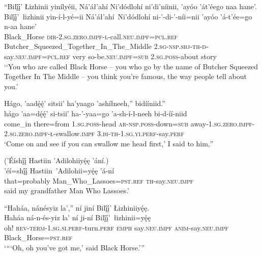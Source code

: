 \ea\label{ex:text2-20-1}
``Bilį́į́’ Łizhinii yinílyéii, Ná’áł’ahí Ni’dódlohí ni’di’níinii, ’ayóo ’át’éego naa hane’.\\
\gll Bilį́į́’~{łizhinii}	yin-í-l-yé=ii	Ná’áł’ahí~{Ni’dódlohí}	ni-’-di-’-níi=nii	’ayóo	’á-t’ée=go	n-aa	hane’\\
     Black\_Horse	\textsc{dir}-2.\textsc{sg}.\textsc{zero}.\textsc{impf}-\textsc{l}-call.\textsc{neu}.\textsc{impf}=\textsc{pcl}.\textsc{ref}	Butcher\_Squeezed\_Together\_In\_The\_Middle	2.\textsc{sg}-\textsc{nsp}.\textsc{sbj}-\textsc{th}-\textsc{d}-say.\textsc{neu}.\textsc{impf}=\textsc{pcl}.\textsc{ref}	very	so-be.\textsc{neu}.\textsc{impf}=\textsc{sub}	2.\textsc{sg}.\textsc{poss}-about	story\\
\glt `{`}You who are called Black Horse -- you who go by the name of Butcher Squeezed Together In The Middle -- you think you're famous, the way people tell about you.'
\z

\ea\label{ex:text2-20-2}
Hágo, ’aadę́ę́’ sitsii’ ha’yaago ’ashíłneeh,'' bidííniid.''\\
\gll hágo	’aa=dę́ę́’	si-tsii’	ha-’-yaa=go	’a-sh-í-ł-neeh	bi-d-íí-niid\\
     come\_in	there=from	1.\textsc{sg}.\textsc{poss}-head	\textsc{ar}-\textsc{nsp}.\textsc{poss}-down=\textsc{sub}	away-1.\textsc{sg}.\textsc{zero}.\textsc{impf}-2.\textsc{sg}.\textsc{zero}.\textsc{impf}-\textsc{ł}-swallow.\textsc{impf}	3.\textsc{bi}-\textsc{th}-1.\textsc{sg}.\textsc{yi}.\textsc{perf}-say.\textsc{perf}\\
\glt `Come on and see if you can swallow me head first,' I said to him,''
\z

\ea\label{ex:text2-20-3}
(’Éíshį́į́ Hastiin ’Adilohiiyę́ę ’ání.)\\
\gll ’éí=shį́į́	Hastiin~{’Adilohii=yę́ę}	’á-ní\\
     that=probably	Man\_Who\_Lassoes=\textsc{pst}.\textsc{ref}	\textsc{th}-say.\textsc{neu}.\textsc{impf}\\
\glt said my grandfather Man Who Lassoes.'
\z

\ea\label{ex:text2-21}
``Haháa, nánésyiz la’,'' ní jiní Bilį́į́’ Łizhiniiyę́ę.\\
\gll Haháa	ná-n-és-yiz	la’	ní	ji-ní	Bilį́į́’~{łizhinii=yę́ę}\\
     oh!	\textsc{rev}-\textsc{term}-1.\textsc{sg}.\textsc{si}.\textsc{perf}-turn.\textsc{perf}	\textsc{emph}	say.\textsc{neu}.\textsc{impf}	\textsc{anim}-say.\textsc{neu}.\textsc{impf}	Black\_Horse=\textsc{pst}.\textsc{ref}\\
\glt `{``}`Oh, oh you've got me,' said Black Horse.'''
\z

